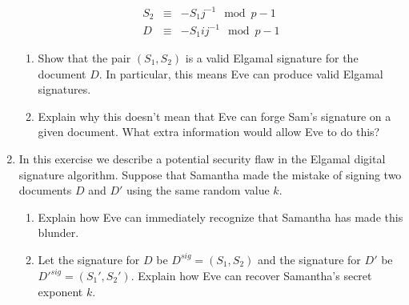 \documentclass[11pt]{article}
\begin{document}
\begin{enumerate}
{\begin{eqnarray*}
    S_2 &\equiv& -S_1j^{-1}\mod p-1\\
    D &\equiv& -S_1ij^{-1}\mod p-1
  \end{eqnarray*}
  \begin{enumerate}
    \item{
    Show that the pair $(S_1,S_2)$ is a valid Elgamal signature for the document $D$.  In particular, this means Eve can produce valid Elgamal signatures.
    }
    \item{
    Explain why this doesn't mean that Eve can forge Sam's signature on a given document.  What extra information would allow Eve to do this?
    }
  \end{enumerate}
  }
  \item{
  In this exercise we describe a potential security flaw in the Elgamal digital signature algorithm.  Suppose that Samantha made the mistake of signing two documents $D$ and $D'$ using the same random value $k$.
  \begin{enumerate}
    \item{
    Explain how Eve can immediately recognize that Samantha has made this blunder.
    }
    \item{
    Let the signature for $D$ be $D^{sig} = (S_1,S_2)$ and the signature for $D'$ be $D'^{sig} = (S_1',S_2')$.  Explain how Eve can recover Samantha's secret exponent $k$.
    }
  \end{enumerate}
  }
\end{enumerate}
\end{document}
